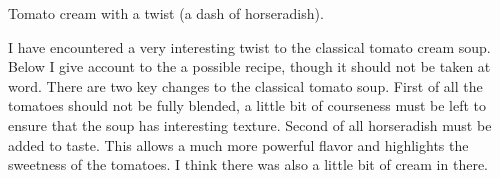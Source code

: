\documentclass[../../../book.tex]{subfiles}
\begin{document}
Tomato cream with a twist (a dash of horseradish).



I have encountered a very interesting twist to the classical tomato cream soup. Below I give account to the a possible recipe, though it should not be taken at word. There are two key changes to the classical tomato soup. First of all the tomatoes should not be fully blended, a little bit of courseness must be left to ensure that the soup has interesting texture. Second of all horseradish must be added to taste. This allows a much more powerful flavor and highlights the sweetness of the tomatoes. I think there was also a little bit of cream in there. 
\end{document}

